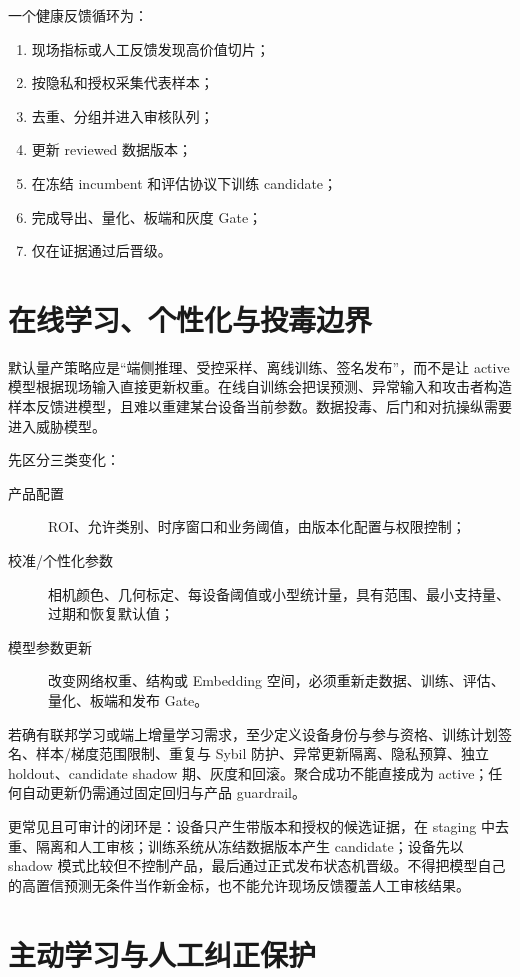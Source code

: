 一个健康反馈循环为：

\begin{enumerate}
  \item 现场指标或人工反馈发现高价值切片；
  \item 按隐私和授权采集代表样本；
  \item 去重、分组并进入审核队列；
  \item 更新 reviewed 数据版本；
  \item 在冻结 incumbent 和评估协议下训练 candidate；
  \item 完成导出、量化、板端和灰度 Gate；
  \item 仅在证据通过后晋级。
\end{enumerate}

\section{在线学习、个性化与投毒边界}

默认量产策略应是“端侧推理、受控采样、离线训练、签名发布”，而不是让 active 模型根据现场输入直接更新权重。在线自训练会把误预测、异常输入和攻击者构造样本反馈进模型，且难以重建某台设备当前参数。数据投毒、后门和对抗操纵需要进入威胁模型\cite{adversarial-ml}。

先区分三类变化：

\begin{description}
  \item[产品配置] ROI、允许类别、时序窗口和业务阈值，由版本化配置与权限控制；
  \item[校准/个性化参数] 相机颜色、几何标定、每设备阈值或小型统计量，具有范围、最小支持量、过期和恢复默认值；
  \item[模型参数更新] 改变网络权重、结构或 Embedding 空间，必须重新走数据、训练、评估、量化、板端和发布 Gate。
\end{description}

若确有联邦学习或端上增量学习需求，至少定义设备身份与参与资格、训练计划签名、样本/梯度范围限制、重复与 Sybil 防护、异常更新隔离、隐私预算、独立 holdout、candidate shadow 期、灰度和回滚。聚合成功不能直接成为 active；任何自动更新仍需通过固定回归与产品 guardrail。

更常见且可审计的闭环是：设备只产生带版本和授权的候选证据，在 staging 中去重、隔离和人工审核；训练系统从冻结数据版本产生 candidate；设备先以 shadow 模式比较但不控制产品，最后通过正式发布状态机晋级。不得把模型自己的高置信预测无条件当作新金标，也不能允许现场反馈覆盖人工审核结果。

\section{主动学习与人工纠正保护}

